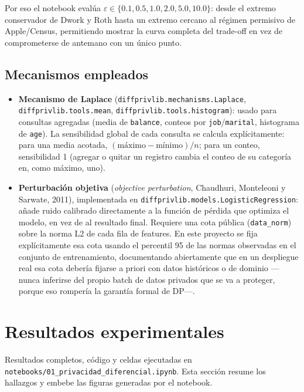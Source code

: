 \documentclass[11pt,a4paper]{article}
\newcommand{\eps}{\ensuremath{\varepsilon}}
\begin{document}
Por eso el notebook evalúa $\eps \in \{0.1, 0.5, 1.0, 2.0, 5.0, 10.0\}$: desde el extremo
conservador de Dwork y Roth hasta un extremo cercano al régimen permisivo de Apple/Census,
permitiendo mostrar la curva completa del trade-off en vez de comprometerse de antemano con un
único punto.

\subsection{Mecanismos empleados}

\begin{itemize}[leftmargin=1.4em]
\item \textbf{Mecanismo de Laplace} (\texttt{diffprivlib.mechanisms.Laplace},
\texttt{diffprivlib.tools.mean}, \texttt{diffprivlib.tools.histogram}): usado para consultas
agregadas (media de \texttt{balance}, conteos por \texttt{job}/\texttt{marital}, histograma de
\texttt{age}). La sensibilidad global de cada consulta se calcula explícitamente: para una media
acotada, $(\text{máximo} - \text{mínimo}) / n$; para un conteo, sensibilidad 1 (agregar o quitar
un registro cambia el conteo de su categoría en, como máximo, uno).
\item \textbf{Perturbación objetiva} (\emph{objective perturbation}, Chaudhuri, Monteleoni y
Sarwate, 2011), implementada en \texttt{diffprivlib.models.LogisticRegression}: añade ruido
calibrado directamente a la función de pérdida que optimiza el modelo, en vez de al resultado
final. Requiere una cota pública (\texttt{data\_norm}) sobre la norma L2 de cada fila de
features. En este proyecto se fija explícitamente esa cota usando el percentil 95 de las normas
observadas en el conjunto de entrenamiento, documentando abiertamente que en un despliegue real
esa cota debería fijarse a priori con datos históricos o de dominio ---nunca inferirse del propio
batch de datos privados que se va a proteger, porque eso rompería la garantía formal de DP---.
\end{itemize}

\section{Resultados experimentales}

Resultados completos, código y celdas ejecutadas en
\texttt{notebooks/01\_privacidad\_diferencial.ipynb}. Esta sección resume los hallazgos y embebe
las figuras generadas por el notebook.
\end{document}
